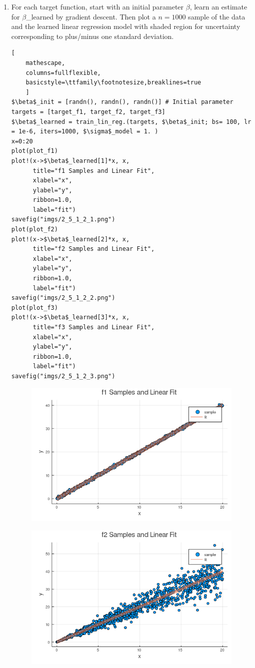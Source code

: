 \documentclass[12pt,letter]{article}
\begin{document}
\begin{enumerate}
\item For each target function, start with an initial parameter $\beta$, learn an estimate for $\beta$_learned by gradient descent. Then plot a $n=1000$ sample of the data and the learned linear regression model with shaded region for uncertainty corresponding to plus/minus one standard deviation.
\begin{lstlisting}[
    mathescape,
    columns=fullflexible,
    basicstyle=\ttfamily\footnotesize,breaklines=true
    ]
$\beta$_init = [randn(), randn(), randn()] # Initial parameter
targets = [target_f1, target_f2, target_f3]
$\beta$_learned = train_lin_reg.(targets, $\beta$_init; bs= 100, lr = 1e-6, iters=1000, $\sigma$_model = 1. )
x=0:20
plot(plot_f1)
plot!(x->$\beta$_learned[1]*x, x,
      title="f1 Samples and Linear Fit",
      xlabel="x",
      ylabel="y",
      ribbon=1.0,
      label="fit")
savefig("imgs/2_5_1_2_1.png")
plot(plot_f2)
plot!(x->$\beta$_learned[2]*x, x,
      title="f2 Samples and Linear Fit",
      xlabel="x",
      ylabel="y",
      ribbon=1.0,
      label="fit")
savefig("imgs/2_5_1_2_2.png")
plot(plot_f3)
plot!(x->$\beta$_learned[3]*x, x,
      title="f3 Samples and Linear Fit",
      xlabel="x",
      ylabel="y",
      ribbon=1.0,
      label="fit")
savefig("imgs/2_5_1_2_3.png")      
\end{lstlisting}
\pagebreak
\begin{figure}[h]
  \centering
  \includegraphics[width=12.5cm,keepaspectratio]{imgs/2_5_1_2_1.png}
\end{figure}
\begin{figure}[h]
  \centering
  \includegraphics[width=12.5cm,keepaspectratio]{imgs/2_5_1_2_2.png}

\end{figure}
\end{enumerate}
\end{document}
